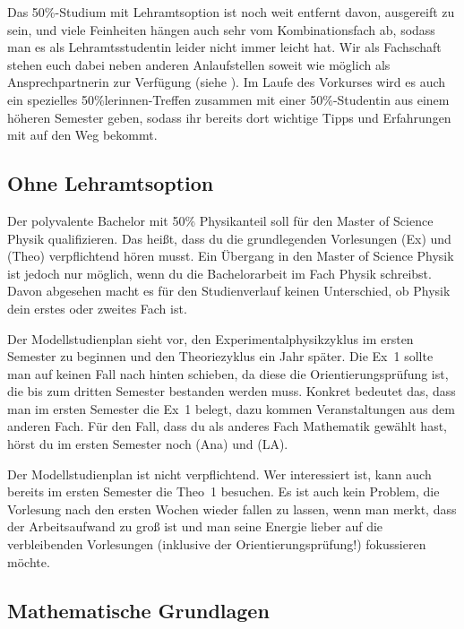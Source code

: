 Das 50\%-Studium mit Lehramtsoption ist noch weit entfernt davon, ausgereift zu sein, und viele Feinheiten hängen auch sehr vom Kombinationsfach ab, sodass man es als Lehramtsstudentin leider nicht immer leicht hat. Wir als Fachschaft stehen euch dabei neben anderen Anlaufstellen soweit wie möglich als Ansprechpartnerin zur Verfügung (siehe ). Im Laufe des Vorkurses wird es auch ein spezielles 50\%lerinnen-Treffen zusammen mit einer 50\%-Studentin aus einem höheren Semester geben, sodass ihr bereits dort wichtige Tipps und Erfahrungen mit auf den Weg bekommt.

\subsection{Ohne Lehramtsoption}

Der polyvalente Bachelor mit 50\% Physikanteil soll für den Master of Science Physik qualifizieren. Das heißt, dass du die grundlegenden Vorlesungen  (\gls{Ex}) und  (\gls{Theo}) verpflichtend hören musst. Ein Übergang in den Master of Science Physik ist jedoch nur möglich, wenn du die Bachelorarbeit im Fach Physik schreibst. Davon abgesehen macht es für den Studienverlauf keinen Unterschied, ob Physik dein erstes oder zweites Fach ist.

Der Modellstudienplan sieht vor, den Experimentalphysikzyklus im ersten Semester zu beginnen und den Theoriezyklus ein Jahr später. Die \gls{Ex}~1 sollte man auf keinen Fall nach hinten schieben, da diese die Orientierungsprüfung ist, die bis zum dritten Semester bestanden werden muss.
Konkret bedeutet das, dass man im ersten Semester die \gls{Ex}~1 belegt, dazu kommen Veranstaltungen aus dem anderen Fach.
Für den Fall, dass du als anderes Fach Mathematik gewählt hast, hörst du im ersten Semester noch  (\gls{Ana}) und  (\gls{LA}).

Der Modellstudienplan ist nicht verpflichtend. Wer interessiert ist, kann auch bereits im ersten Semester die \gls{Theo}~1 besuchen. Es ist auch kein Problem, die Vorlesung nach den ersten Wochen wieder fallen zu lassen, wenn man merkt, dass der Arbeitsaufwand zu groß ist und man seine Energie lieber auf die verbleibenden Vorlesungen (inklusive der Orientierungsprüfung!) fokussieren möchte.

\subsection{Mathematische Grundlagen}
\label{mathegrundlagen}

